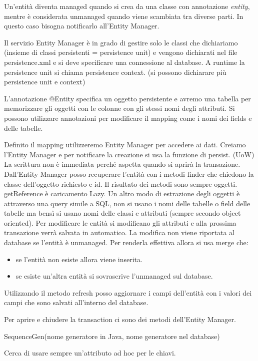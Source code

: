 Un'entità diventa managed quando si crea da una classe con annotazione
\textit{entity}, mentre è considerata unmanaged quando viene scambiata tra diverse
parti. In questo caso bisogna notificarlo all'Entity Manager.

Il servizio Entity Manager è in grado di gestire solo le classi che dichiariamo
(insieme di classi persistenti = persistence unit) e vengono dichiarati nel file
persistence.xml e si deve specificare una connessione al database. A runtime la
persistence unit si chiama persistence context. (si possono dichiarare più
persistence unit e context)

L'annotazione @Entity specifica un oggetto persistente e avremo una tabella
per memorizzare gli oggetti con le colonne con gli stessi nomi degli attributi.
Si possono utilizzare annotazioni per modificare il mapping come i nomi dei
fields e delle tabelle.

Definito il mapping utilizzeremo Entity Manager per accedere ai dati. Creiamo
l'Entity Manager e per notificare la creazione si usa la funzione di persist.
(UoW) La scrittura non è immediata perché aspetta quando si aprirà la transazione.
Dall'Entity Manager posso recuperare l'entità con i metodi finder che chiedono la
classe dell'oggetto richiesto e id. Il risultato dei metodi sono sempre oggetti.
getReference è caricamento Lazy.
Un altro modo di estrazione degli oggetti è attraverso una query simile a SQL,
non si usano i nomi delle tabelle o field delle tabelle ma bensì si usano nomi delle
classi e attributi (sempre secondo object oriented).
Per modificare le entità si modificano gli attributi e alla prossima transazione
verrà salvata in automatico. La modifica non viene riportata al database se
l'entità è unmanaged. Per renderla effettiva allora si usa merge che:
\begin{itemize}
      \item se l'entità non esiste allora viene inserita.
      \item se esiste un'altra entità si sovrascrive l'unmanaged sul database.
\end{itemize}
Utilizzando il metodo refresh posso aggiornare i campi dell'entità con i valori
dei campi che sono salvati all'interno del database.

Per aprire e chiudere la transaction ci sono dei metodi dell'Entity Manager.

SequenceGen(nome generatore in Java, nome generatore nel database)

Cerca di usare sempre un'attributo ad hoc per le chiavi.

